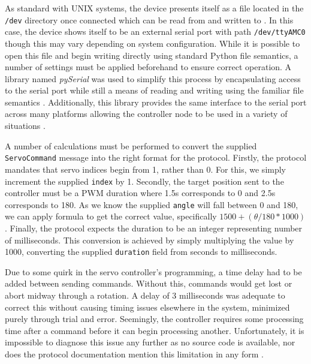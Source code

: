As standard with UNIX systems, the device presents itself as a file located in the \texttt{/dev} directory once connected which can be read from and written to \cite{unix_devices}. In this case, the device shows itself to be an external serial port with path \texttt{/dev/ttyAMC0} though this may vary depending on system configuration. While it is possible to open this file and begin writing directly using standard Python file semantics, a number of settings must be applied beforehand to ensure correct operation. A library named \emph{pySerial} was used to simplify this process by encapsulating access to the serial port while still a means of reading and writing using the familiar file semantics \cite{pyserial}. Additionally, this library provides the same interface to the serial port across many platforms allowing the controller node to be used in a variety of situations \cite{pyserial}.

A number of calculations must be performed to convert the supplied \texttt{ServoCommand} message into the right format for the protocol. Firstly, the protocol mandates that servo indices begin from 1, rather than 0. For this, we simply increment the supplied \texttt{index} by 1. Secondly, the target position sent to the controller must be a PWM duration where 1.5\textmu{}s corresponds to 0\textdegree{} and 2.5\textmu{}s corresponds to 180\textdegree{}. As we know the supplied \texttt{angle} will fall between 0 and 180, we can apply formula to get the correct value, specifically $1500 + (\theta / 180 * 1000)$. Finally, the protocol expects the duration to be an integer representing number of milliseconds. This conversion is achieved by simply multiplying the value by 1000, converting the supplied \texttt{duration} field from seconds to milliseconds.

Due to some quirk in the servo controller's programming, a time delay had to be added between sending commands. Without this, commands would get lost or abort midway through a rotation. A delay of 3 milliseconds was adequate to correct this without causing timing issues elsewhere in the system, minimized purely through trial and error. Seemingly, the controller requires some processing time after a command before it can begin processing another. Unfortunately, it is impossible to diagnose this issue any further as no source code is available, nor does the protocol documentation mention this limitation in any form \cite{torobot_manual}.


